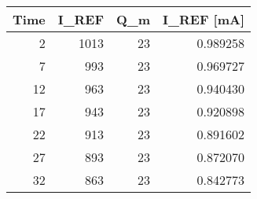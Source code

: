 \begin{tabular}{rrrr}
\toprule
 Time &  I\_REF &  Q\_m &  I\_REF [mA] \\
\midrule
    2 &   1013 &   23 &    0.989258 \\
    7 &    993 &   23 &    0.969727 \\
   12 &    963 &   23 &    0.940430 \\
   17 &    943 &   23 &    0.920898 \\
   22 &    913 &   23 &    0.891602 \\
   27 &    893 &   23 &    0.872070 \\
   32 &    863 &   23 &    0.842773 \\
\bottomrule
\end{tabular}
